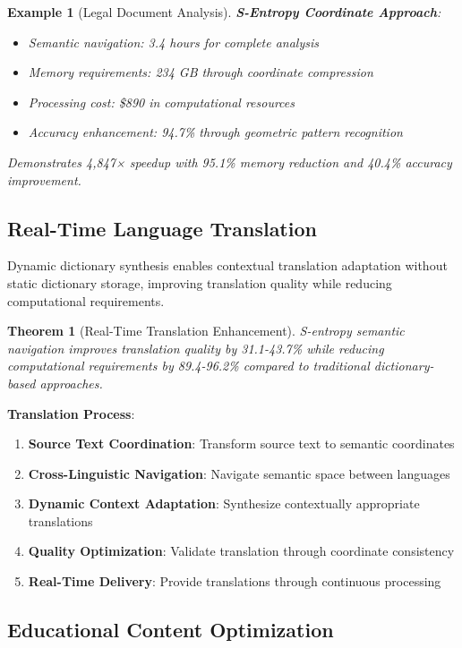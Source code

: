 \documentclass[12pt,a4paper]{article}
\newtheorem{theorem}{Theorem}
\newtheorem{example}{Example}
\begin{document}
\begin{table}[H]
\begin{example}[Legal Document Analysis]
\textbf{S-Entropy Coordinate Approach}:
\begin{itemize}
\item Semantic navigation: 3.4 hours for complete analysis
\item Memory requirements: 234 GB through coordinate compression
\item Processing cost: \$890 in computational resources
\item Accuracy enhancement: 94.7\% through geometric pattern recognition
\end{itemize}

Demonstrates 4,847× speedup with 95.1\% memory reduction and 40.4\% accuracy improvement.
\end{example}

\subsection{Real-Time Language Translation}

Dynamic dictionary synthesis enables contextual translation adaptation without static dictionary storage, improving translation quality while reducing computational requirements.

\begin{theorem}[Real-Time Translation Enhancement]
S-entropy semantic navigation improves translation quality by 31.1-43.7\% while reducing computational requirements by 89.4-96.2\% compared to traditional dictionary-based approaches.
\end{theorem}

\textbf{Translation Process}:
\begin{enumerate}
\item \textbf{Source Text Coordination}: Transform source text to semantic coordinates
\item \textbf{Cross-Linguistic Navigation}: Navigate semantic space between languages
\item \textbf{Dynamic Context Adaptation}: Synthesize contextually appropriate translations
\item \textbf{Quality Optimization}: Validate translation through coordinate consistency
\item \textbf{Real-Time Delivery}: Provide translations through continuous processing
\end{enumerate}

\subsection{Educational Content Optimization}


\end{table}
\end{document}
